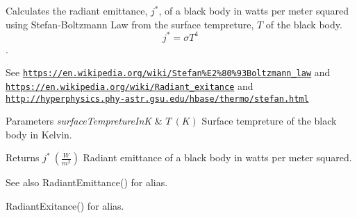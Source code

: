 Calculates the radiant emittance, $j^*$, of a black body in watts per meter squared using Stefan-\/\+Boltzmann Law from the surface tempreture, $T$ of the black body. \[j^*=\sigma T^4\]. 

See \href{https://en.wikipedia.org/wiki/Stefan%E2%80%93Boltzmann_law}{\tt https\+://en.\+wikipedia.\+org/wiki/\+Stefan\%\+E2\%80\%93\+Boltzmann\+\_\+law} and \href{https://en.wikipedia.org/wiki/Radiant_exitance}{\tt https\+://en.\+wikipedia.\+org/wiki/\+Radiant\+\_\+exitance} and \href{http://hyperphysics.phy-astr.gsu.edu/hbase/thermo/stefan.html}{\tt http\+://hyperphysics.\+phy-\/astr.\+gsu.\+edu/hbase/thermo/stefan.\+html}


\begin{DoxyParams}{Parameters}
{\em surface\+Tempreture\+InK} & $T\ (K)$ Surface tempreture of the black body in Kelvin. \\
\hline
\end{DoxyParams}
\begin{DoxyReturn}{Returns}
$j^*\ (\frac{W}{m^2})$ Radiant emittance of a black body in watts per meter squared. 
\end{DoxyReturn}
\begin{DoxySeeAlso}{See also}
Radiant\+Emittance() for alias. 

Radiant\+Exitance() for alias. 
\end{DoxySeeAlso}
